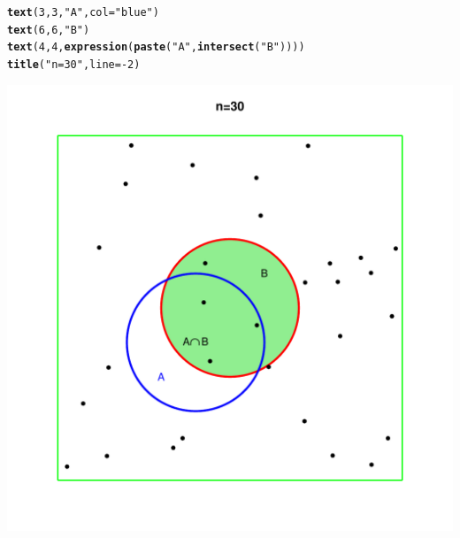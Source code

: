 \documentclass[onecolumn,12pt]{book}\usepackage[]{graphicx}\usepackage[]{color}
\makeatletter
\def\maxwidth{ %
  \ifdim\Gin@nat@width>\linewidth
    \linewidth
  \else
    \Gin@nat@width
  \fi
}
\newcommand{\hlnum}[1]{\textcolor[rgb]{0.686,0.059,0.569}{#1}}%
\newcommand{\hlstr}[1]{\textcolor[rgb]{0.192,0.494,0.8}{#1}}%
\newcommand{\hlopt}[1]{\textcolor[rgb]{0,0,0}{#1}}%
\newcommand{\hlstd}[1]{\textcolor[rgb]{0.345,0.345,0.345}{#1}}%
\newcommand{\hlkwc}[1]{\textcolor[rgb]{0.333,0.667,0.333}{#1}}%
\newcommand{\hlkwd}[1]{\textcolor[rgb]{0.737,0.353,0.396}{\textbf{#1}}}%
\newenvironment{kframe}{%
 \def\at@end@of@kframe{}%
 \ifinner\ifhmode%
  \def\at@end@of@kframe{\end{minipage}}%
  \begin{minipage}{\columnwidth}%
 \fi\fi%
 \def\FrameCommand##1{\hskip\@totalleftmargin \hskip-\fboxsep
 \colorbox{shadecolor}{##1}\hskip-\fboxsep
     \hskip-\linewidth \hskip-\@totalleftmargin \hskip\columnwidth}%
 \MakeFramed {\advance\hsize-\width
   \@totalleftmargin\z@ \linewidth\hsize
   \@setminipage}}%
 {\par\unskip\endMakeFramed%
 \at@end@of@kframe}
\newenvironment{knitrout}{}{} %
\makeatother
\begin{document}
\begin{knitrout}
\begin{kframe}
\begin{alltt}
\hlkwd{text}\hlstd{(}\hlnum{3}\hlstd{,}\hlnum{3}\hlstd{,}\hlstr{"A"}\hlstd{,}\hlkwc{col}\hlstd{=}\hlstr{"blue"}\hlstd{)}
\hlkwd{text}\hlstd{(}\hlnum{6}\hlstd{,}\hlnum{6}\hlstd{,}\hlstr{"B"}\hlstd{)}
\hlkwd{text}\hlstd{(}\hlnum{4}\hlstd{,}\hlnum{4}\hlstd{,}\hlkwd{expression}\hlstd{(}\hlkwd{paste}\hlstd{(}\hlstr{"A"}\hlstd{,}\hlkwd{intersect}\hlstd{(}\hlstr{"B"}\hlstd{))))}
\hlkwd{title}\hlstd{(}\hlstr{"n=30"}\hlstd{,}\hlkwc{line}\hlstd{=}\hlopt{-}\hlnum{2}\hlstd{)}
\end{alltt}
\end{kframe}
\includegraphics[width=\maxwidth]{figure/unnamed-chunk-6-1} 

\end{knitrout}
\end{document}
